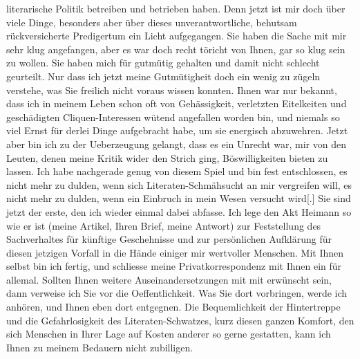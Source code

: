 \begin{ledgroupsized}[t]{13cm}
               literarische Politik betreiben und betrieben haben. Denn jetzt ist mir doch über
               viele Dinge, besonders aber über dieses unverantwortliche, behutsam rückversicherte
               Predigertum ein Licht aufgegangen.\pend
           \pstart
           Sie haben die Sache mit mir sehr klug angefangen, aber es war doch recht töricht von
               Ihnen, gar so klug sein zu wollen. Sie haben mich für gutmütig gehalten und damit
               nicht schlecht ge{\pb}urteilt. Nur
               dass ich jetzt meine Gutmütigheit doch ein wenig zu zügeln verstehe, was Sie freilich
               nicht voraus wissen konnten. Ihnen war nur bekannt, dass ich in meinem Leben schon
               oft von Gehässigkeit, verletzten Eitelkeiten und geschädigten Cliquen-Interessen
               wütend angefallen worden bin, und niemals so viel Ernst für derlei Dinge aufgebracht
               habe, um sie energisch abzuwehren. Jetzt aber bin ich zu der Ueberzeugung gelangt,
               dass es ein Unrecht war, mir von den Leuten, denen meine Kritik wider den Strich
               ging, Böswilligkeiten bieten zu lassen. Ich habe nachgerade genug von diesem Spiel
               und bin fest entschlossen, es nicht mehr zu dulden, wenn sich Literaten-Schmähsucht
               an mir vergreifen will, es nicht mehr zu dulden, wenn ein Einbruch in mein Wesen
               versucht wird{[}.{]} Sie sind jetzt der erste, den ich wieder einmal
               dabei abfasse.\pend
           \pstart
           Ich lege den Akt Heimann so wie er ist (meine
               Artikel, Ihren Brief, meine Antwort) zur Feststellung des Sachverhaltes für künftige
               Geschehnisse und zur persönlichen Aufklärung für diesen jetzigen Vorfall in die Hände
               einiger mir wertvoller Menschen.\pend
           \pstart
           Mit Ihnen selbst bin ich fertig, und schliesse meine Privatkorrespondenz mit Ihnen
               ein für allemal. Sollten Ihnen weitere Auseinandersetzungen mit mit erwünscht sein,
               dann verweise ich Sie vor die Oeffentlichkeit. Was Sie dort vorbringen, werde ich
               anhören, und Ihnen eben dort entgegnen. Die Bequemlichkeit der Hintertreppe und die
               Gefahrlosigkeit des Literaten-Schwatzes, kurz diesen ganzen Komfort, den sich
               Menschen in Ihrer Lage auf Kosten anderer so gerne gestatten, kann ich Ihnen zu
               meinem Bedauern nicht zubilligen.\pend
           
         
         \endnumbering{}\end{ledgroupsized}\begin{anhang}\end{anhang}\newcommand{\dateiname}{L03438}\newcommand{\titel}{Felix Salten an Arthur Schnitzler, 20. 4. 1907}\newcommand{\editorInnen}{Martin Anton Müller und Laura Untner}
      
